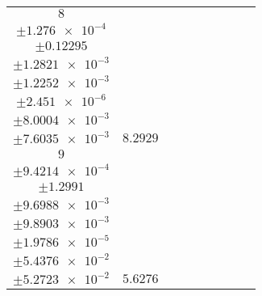 \documentclass[8pt]{article}
\begin{document}
\begin{longtable}[l]{c c c c c c c c c}
$\num{8}$ & \begin{tabular}[c]{@{}c@{}}$\num{5.9914e-2}$ \\ $\pm\num{1.276e-4}$\end{tabular} & \begin{tabular}[c]{@{}c@{}}$\num{-0.35424}$ \\ $\pm\num{0.12295}$\end{tabular} & \begin{tabular}[c]{@{}c@{}}$\num{10.348}$ \\ $\pm\num{1.2821e-3}$\end{tabular} & \begin{tabular}[c]{@{}c@{}}$\num{1.5762e+3}$ \\ $\pm\num{1.2252e-3}$\end{tabular} & \begin{tabular}[c]{@{}c@{}}$\num{3.1532}$ \\ $\pm\num{2.451e-6}$\end{tabular} & \begin{tabular}[c]{@{}c@{}}$\num{3.3708}$ \\ $\pm\num{8.0004e-3}$\end{tabular} & \begin{tabular}[c]{@{}c@{}}$\num{3.2516}$ \\ $\pm\num{7.6035e-3}$\end{tabular} & $\num{8.2929}$\\
$\num{9}$ & \begin{tabular}[c]{@{}c@{}}$\num{4.6507e-2}$ \\ $\pm\num{9.4214e-4}$\end{tabular} & \begin{tabular}[c]{@{}c@{}}$\num{-0.96127}$ \\ $\pm\num{1.2991}$\end{tabular} & \begin{tabular}[c]{@{}c@{}}$\num{1.74}$ \\ $\pm\num{9.6988e-3}$\end{tabular} & \begin{tabular}[c]{@{}c@{}}$\num{1.5763e+3}$ \\ $\pm\num{9.8903e-3}$\end{tabular} & \begin{tabular}[c]{@{}c@{}}$\num{3.1534}$ \\ $\pm\num{1.9786e-5}$\end{tabular} & \begin{tabular}[c]{@{}c@{}}$\num{5.2376}$ \\ $\pm\num{5.4376e-2}$\end{tabular} & \begin{tabular}[c]{@{}c@{}}$\num{5.2347}$ \\ $\pm\num{5.2723e-2}$\end{tabular} & $\num{5.6276}$\\

\end{longtable}
\end{document}
